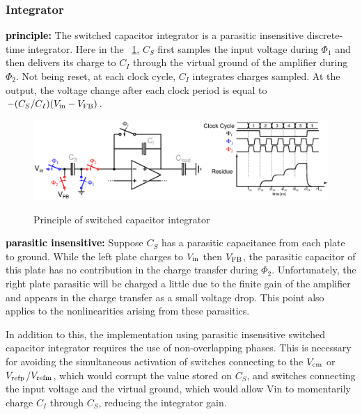 	\subsubsection{Integrator}              %
\textbf{\textcolor{black}{principle:}}
The switched capacitor integrator is a parasitic insensitive discrete-time integrator. Here in the \figurename~\ref{fig:sigma-delta-integration}, $C_S$ first samples the input voltage during $\Phi_1$ and then delivers its charge to $C_I$ through the virtual ground of the amplifier during $\Phi_2$. Not being reset, at each clock cycle, $C_I$ integrates charges sampled. At the output, the voltage change after each clock period is equal to $-(C_S/C_I)(V_{\rm in} - V_{\rm FB})$.

\begin{figure}[htp]
	\centering
	\includegraphics[width=\textwidth]{Chapter4/Figs/sigma-delta-integration.ps}
	\begin{subfigure}[b]{0.48\textwidth}
		\centering
	\end{subfigure}
	\begin{subfigure}[b]{0.48\textwidth}
		\centering
	\end{subfigure}
	\caption{Principle of switched capacitor integrator}
	\label{fig:sigma-delta-integration}
\end{figure}

\textbf{\textcolor{black}{parasitic insensitive:}}
Suppose $C_S$ has a parasitic capacitance from each plate to ground. While the left plate charges to $V_{\rm in}$ then $V_{\rm FB}$, the parasitic capacitor of this plate has no contribution in the charge transfer during $\Phi_2$. Unfortunately, the right plate parasitic will be charged a little due to the finite gain of the amplifier and appears in the charge transfer as a small voltage drop. This point also applies to the nonlinearities arising from these parasitics.

In addition to this, the implementation using parasitic insensitive switched capacitor integrator requires the use of non-overlapping phases. This is necessary for avoiding the simultaneous activation of switches connecting to the $V_{\rm cm}$ or $V_{\rm refp}$/$V_{\rm refm}$, which would corrupt the value stored on $C_S$, and switches connecting the input voltage and the virtual ground, which would allow Vin to momentarily charge $C_I$ through $C_S$, reducing the integrator gain.

